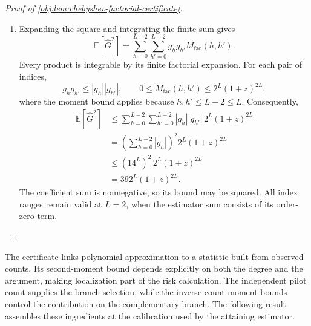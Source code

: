 \documentclass[11pt]{article}
\begin{document}
\begin{proof}[Proof of \cref{obj:lem:chebyshev-factorial-certificate}]
\begin{enumerate}
Also, for every overlap index in the displayed sum,
\[
z^{h+h'-j_{\mathrm{ov}}}
 \le(1+z)^{h+h'-j_{\mathrm{ov}}}
 \le(1+z)^{2L},
\]
because \(z\ge0\), \(1+z\ge1\), and \(h+h'-j_{\mathrm{ov}}\le2L\). These inequalities include \(z=0\) under the stated power convention. Hence
\[
\begin{aligned}
M_{\mathrm{fac}}(h,h')
 &\le\sum_{j_{\mathrm{ov}}=0}^{\min(h,h')}
       \binom{h}{j_{\mathrm{ov}}}(1+z)^{2L}\\
 &\le\sum_{j_{\mathrm{ov}}=0}^{h}
       \binom{h}{j_{\mathrm{ov}}}(1+z)^{2L}\\
 &=2^h(1+z)^{2L}\\
 &\le2^L(1+z)^{2L}.
\end{aligned}
\]
The second inequality adds nonnegative terms, and the equality is the binomial theorem.

\item Expanding the square and integrating the finite sum gives
\[
\mathbb E[\widehat G^2]
 =\sum_{h=0}^{L-2}\sum_{h'=0}^{L-2}
   g_hg_{h'}M_{\mathrm{fac}}(h,h').
\]
Every product is integrable by its finite factorial expansion. For each pair of indices,
\[
g_hg_{h'}\le|g_h||g_{h'}|,
\qquad
0\le M_{\mathrm{fac}}(h,h')
 \le2^L(1+z)^{2L},
\]
where the moment bound applies because \(h,h'\le L-2\le L\). Consequently,
\[
\begin{aligned}
\mathbb E[\widehat G^2]
 &\le\sum_{h=0}^{L-2}\sum_{h'=0}^{L-2}
       |g_h||g_{h'}|\,2^L(1+z)^{2L}\\
 &=\left(\sum_{h=0}^{L-2}|g_h|\right)^2
      2^L(1+z)^{2L}\\
 &\le(14^L)^2\,2^L(1+z)^{2L}\\
 &=392^L(1+z)^{2L}.
\end{aligned}
\]
The coefficient sum is nonnegative, so its bound may be squared. All index ranges remain valid at \(L=2\), when the estimator sum consists of its order-zero term.
\end{enumerate}
\end{proof}

The certificate links polynomial approximation to a statistic built from observed counts. Its second-moment bound depends explicitly on both the degree and the argument, making localization part of the risk calculation. The independent pilot count supplies the branch selection, while the inverse-count moment bounds control the contribution on the complementary branch. The following result assembles these ingredients at the calibration used by the attaining estimator.
\end{document}
